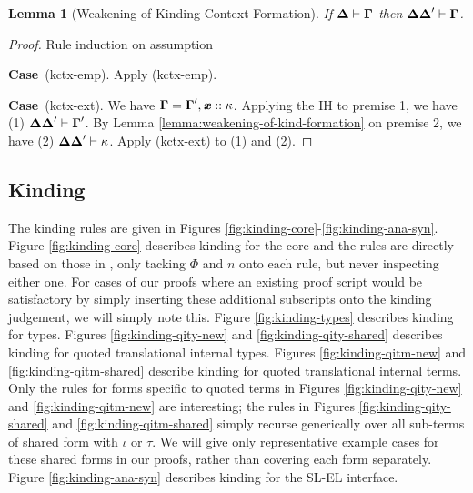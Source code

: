 \documentclass[12pt]{article}
\newtheorem{lemma}{Lemma}
\newcommand{\pfcase}[1]{\textbf{Case}~#1. }
\begin{document}
\begin{lemma}[Weakening of Kinding Context Formation]
\label{lemma:weakening-of-kinding-context-formation}
If $\boldsymbol\Delta \vdash \boldsymbol\Gamma$ then $\boldsymbol\Delta\boldsymbol\Delta' \vdash \boldsymbol\Gamma$.
\end{lemma}
\begin{proof} Rule induction on assumption

\pfcase{(kctx-emp)} Apply (kctx-emp).

\pfcase{(kctx-ext)} We have $\boldsymbol\Gamma=\boldsymbol\Gamma', {\textbf{\textit{x}}} :: \kappa$. Applying the IH to premise 1, we have (1) $\boldsymbol\Delta\boldsymbol\Delta' \vdash \boldsymbol\Gamma'$. By Lemma \ref{lemma:weakening-of-kind-formation} on premise 2, we have (2) $\boldsymbol\Delta\boldsymbol\Delta' \vdash \kappa$. Apply (kctx-ext) to (1) and (2).
\end{proof}

\subsection{Kinding}
The kinding rules are given in Figures \ref{fig:kinding-core}-\ref{fig:kinding-ana-syn}. Figure \ref{fig:kinding-core} describes kinding for the core and the rules are directly based on those in \cite{pfpl}, only tacking $\Phi$ and $n$ onto each rule, but never inspecting either one. For cases of our proofs where an existing proof script would be satisfactory by simply inserting these additional subscripts onto the kinding judgement, we will simply note this. Figure \ref{fig:kinding-types} describes kinding for types. Figures \ref{fig:kinding-qity-new} and \ref{fig:kinding-qity-shared} describes kinding for quoted translational internal types. Figures \ref{fig:kinding-qitm-new} and \ref{fig:kinding-qitm-shared} describe kinding for quoted translational internal terms. Only the rules for forms specific to quoted terms in Figures \ref{fig:kinding-qity-new} and \ref{fig:kinding-qitm-new} are interesting; the rules in Figures \ref{fig:kinding-qity-shared} and \ref{fig:kinding-qitm-shared} simply recurse generically over all sub-terms of shared form with $\iota$ or $\tau$. We will give only representative example cases for these shared forms in our proofs, rather than covering each form separately. Figure \ref{fig:kinding-ana-syn} describes kinding for the SL-EL interface.
\end{document}
